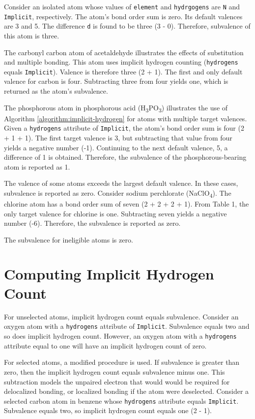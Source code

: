 \documentclass{article}
\def\ttt{\texttt}
\begin{document}
Consider an isolated atom whose values of \ttt{element} and \ttt{hydrgogens} are \ttt{N} and \ttt{Implicit}, respectively. The atom's bond order sum is zero. Its default valences are 3 and 5. The difference \ttt{d} is found to be three (3 - 0). Therefore, subvalence of this atom is three.

The carbonyl carbon atom of acetaldehyde illustrates the effects of substitution and multiple bonding. This atom uses implicit hydrogen counting (\ttt{hydrogens} equals \ttt{Implicit}). Valence is therefore three (2 + 1). The first and only default valence for carbon is four. Subtracting three from four yields one, which is returned as the atom's subvalence.

The phosphorous atom in phosphorous acid (H\textsubscript{3}PO\textsubscript{3}) illustrates the use of Algorithm \ref{algorithm:implicit-hydrogen} for atoms with multiple target valences. Given a \ttt{hydrogens} attribute of \ttt{Implicit}, the atom's bond order sum is four (2 + 1 + 1). The first target valence is 3, but subtracting that value from four yields a negative number (-1). Continuing to the next default valence, 5, a difference of 1 is obtained. Therefore, the subvalence of the phosphorous-bearing atom is reported as 1.

The valence of some atoms exceeds the largest default valence. In these cases, subvalence is reported as zero. Consider sodium perchlorate (NaClO\textsubscript{4}). The chlorine atom has a bond order sum of seven (2 + 2 + 2 + 1). From Table 1, the only target valence for chlorine is one. Subtracting seven yields a negative number (-6). Therefore, the subvalence is reported as zero.

The subvalence for ineligible atoms is zero.

\section*{Computing Implicit Hydrogen Count}

For unselected atoms, implicit hydrogen count equals subvalence. Consider an oxygen atom with a \ttt{hydrogens} attribute of \ttt{Implicit}. Subvalence equals two and so does implicit hydrogen count. However, an oxygen atom with a \ttt{hydrogens} attribute equal to one will have an implicit hydrogen count of zero.

For selected atoms, a modified procedure is used. If subvalence is greater than zero, then the implicit hydrogen count equals subvalence minus one. This subtraction models the unpaired electron that would would be required for delocalized bonding, or localized bonding if the atom were deselected. Consider a selected carbon atom in benzene whose \ttt{hydrogens} attribute equals \ttt{Implicit}. Subvalence equals two, so implicit hydrogen count equals one (2 - 1).
\end{document}
